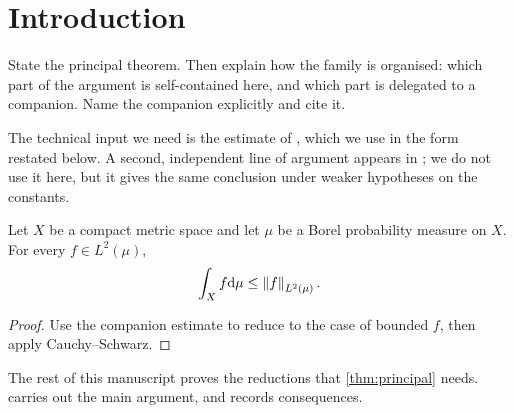 
\section{Introduction}
\label{sec:introduction}

State the principal theorem. Then explain how the family is organised:
which part of the argument is self-contained here, and which part is
delegated to a companion. Name the companion explicitly and cite it.

The technical input we need is the estimate of \cite{companion-a},
which we use in the form restated below. A second, independent line of
argument appears in \cite{companion-b}; we do not use it here, but it
gives the same conclusion under weaker hypotheses on the constants.

\begin{theorem}
\label{thm:principal}
Let $X$ be a compact metric space and let $\mu$ be a Borel probability
measure on $X$. For every $f \in L^2(\mu)$,
\begin{equation}
\label{eq:principal}
  \int_X f \mathrm{d}\mu \le \left\lVert f \right\rVert_{L^2(\mu)} .
\end{equation}
\end{theorem}

\begin{proof}
Use the companion estimate \cite[Theorem 3.2]{companion-a} to reduce to
the case of bounded $f$, then apply Cauchy--Schwarz.
\end{proof}

The rest of this manuscript proves the reductions that
\cref{thm:principal} needs.  carries out the main
argument, and  records consequences.
